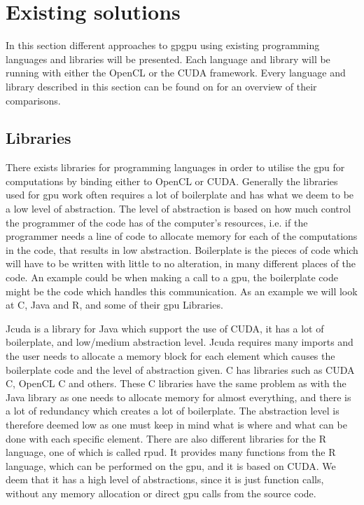 \section{Existing solutions} %
\label{sec:state_of_the_art}
In this section different approaches to \acrshort{gpgpu} using existing programming languages and libraries will be presented.
Each language and library will be running with either the OpenCL or the CUDA framework.
Every language and library described in this section can be found on  for an overview of their comparisons.
      
\subsection{Libraries} 
There exists libraries for programming languages in order to utilise the \acrshort{gpu} for computations by binding either to OpenCL or CUDA.
Generally the libraries used for \acrshort{gpu} work often requires a lot of boilerplate and has what we deem to be a low level of abstraction.
The level of abstraction is based on how much control the programmer of the code has of the computer's resources, i.e. if the programmer needs a line of code to allocate memory for each of the computations in the code, that results in low abstraction.
Boilerplate is the pieces of code which will have to be written with little to no alteration, in many different places of the code.
An example could be when making a call to a \acrshort{gpu}, the boilerplate code might be the code which handles this communication.
As an example we will look at C, Java and R, and some of their \acrshort{gpu} Libraries.

Jcuda is a library for Java which support the use of CUDA, it has a lot of boilerplate, and low/medium abstraction level. \citep{Java_library}
Jcuda requires many imports and the user needs to allocate a memory block for each element which causes the boilerplate code and the level of abstraction given. \citep{Java_malloc}
C has libraries such as CUDA C, OpenCL C and others.
These C libraries have the same problem as with the Java library as one needs to allocate memory for almost everything, and there is a lot of redundancy which creates a lot of boilerplate. 
The abstraction level is therefore deemed low as one must keep in mind what is where and what can be done with each specific element. \citep{C_CUDA} 
There are also different libraries for the R language, one of which is called rpud.
It provides many functions from the R language, which can be performed on the \acrshort{gpu}, and it is based on CUDA.
We deem that it has a high level of abstractions, since it is just function calls, without any memory allocation or direct \acrshort{gpu} calls from the source code. \citep{Rcuda} 

